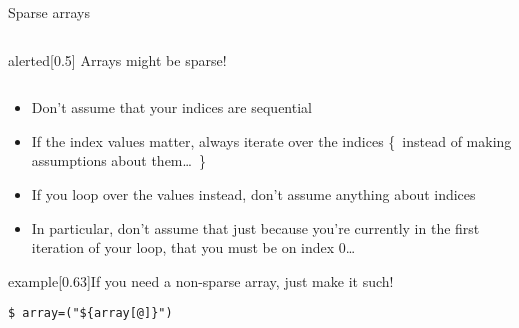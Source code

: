 \begin{frame}[fragile]{Sparse arrays}
    \medskip
    \begin{columns}[c]
        \begin{column}{0.75\textwidth}
            \begin{varblock}{alerted}[0.5\textwidth]{}
                \Large \alert{Arrays might be sparse!}
            \end{varblock}
        \end{column}
        \begin{column}{0.25\textwidth}
        \end{column}
    \end{columns}
    \bigskip
    \begin{itemize}
        \item Don't assume that your indices are sequential
        \item If the index values matter, always iterate over the indices {\tiny\{~instead of making assumptions about them\ldots~\}}
        \item If you loop over the values instead, don't assume anything about indices
        \item In particular, don't assume that just because you're currently in the first iteration of your loop, that you must be on index 0\ldots
    \end{itemize}
    \begin{varblock}{example}[0.63\textwidth]{\large If you need a non-sparse array, just make it such!}
        \begin{lstlisting}[style=MyBash, numbers=none, aboveskip=2mm, belowskip=-5mm, xleftmargin=13mm, xrightmargin=13mm]
            $ array=("${array[@]}")
        \end{lstlisting}
    \end{varblock}
\end{frame}
